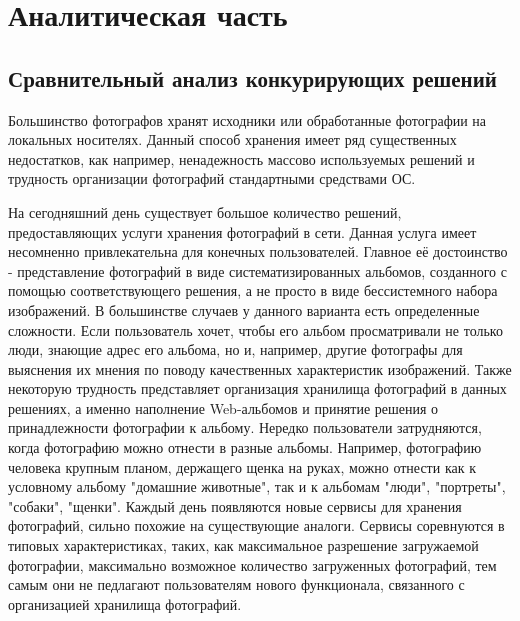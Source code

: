 \sectioncounter
\section{Аналитическая часть}\label{analytics}

\subsection{Сравнительный анализ конкурирующих решений} \label{comparsion}

Большинство фотографов хранят исходники или обработанные фотографии на локальных носителях.
Данный способ хранения имеет ряд существенных недостатков, как например, ненадежность массово используемых решений и трудность организации фотографий стандартными средствами ОС.

На сегодняшний день существует большое количество решений, предоставляющих услуги хранения  фотографий в сети.
Данная услуга имеет несомненно привлекательна для конечных пользователей.
Главное её достоинство - представление фотографий в виде систематизированных альбомов, созданного с помощью соответствующего решения, а не просто в виде бессистемного набора изображений.
В большинстве случаев у данного варианта есть определенные сложности. 
Если пользователь хочет, чтобы его альбом просматривали не только люди, знающие адрес его альбома, но и, например, другие фотографы для выяснения их мнения по поводу качественных характеристик изображений.
Также некоторую трудность представляет организация хранилища фотографий в данных решениях, а именно наполнение Web-альбомов и принятие решения о принадлежности фотографии к альбому. 
Нередко пользователи затрудняются, когда фотографию можно отнести в разные альбомы. Например, фотографию человека крупным планом, держащего щенка на руках, можно отнести как к условному альбому "домашние животные", так и к альбомам "люди", "портреты", "собаки", "щенки".
Каждый день появляются новые сервисы для хранения фотографий, сильно похожие на существующие аналоги.
Сервисы соревнуются в типовых характеристиках, таких, как максимальное разрешение загружаемой фотографии, максимально возможное количество загруженных фотографий, тем самым они не педлагают пользователям нового функционала, связанного с организацией хранилища фотографий.

